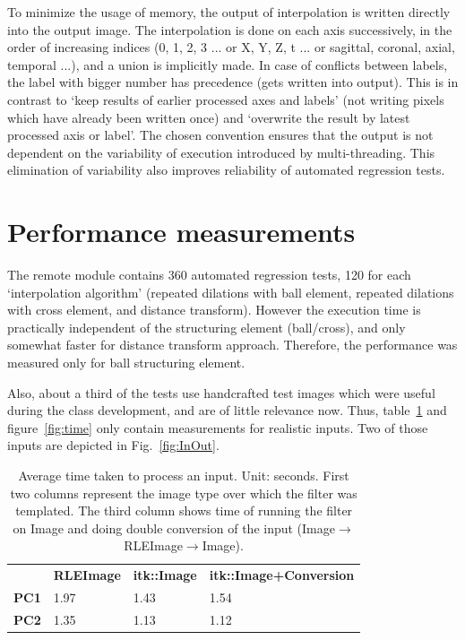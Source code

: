 \documentclass{InsightArticle}
\begin{document}
To minimize the usage of memory, the output of interpolation is written
directly into the output image.
The interpolation is done on each axis successively,
in the order of increasing indices (0, 1, 2, 3 ... or X, Y, Z, t ...
or sagittal, coronal, axial, temporal ...), and a union is implicitly made.
In case of conflicts between labels,
the label with bigger number has precedence (gets written into output).
This is in contrast to `keep results of earlier processed axes and labels'
(not writing pixels which have already been written once)
and `overwrite the result by latest processed axis or label'.
The chosen convention ensures that the output is not dependent on the
variability of execution introduced by multi-threading.
This elimination of variability also improves
reliability of automated regression tests.


\section{Performance measurements}

The remote module %
contains 360 automated regression tests, 120 for each `interpolation algorithm'
(repeated dilations with ball element, repeated dilations with cross element, and distance transform).
However the execution time is practically independent of the structuring element (ball/cross),
and only somewhat faster for distance transform approach.
Therefore, the performance was measured only for ball structuring element.

Also, about a third of the tests use handcrafted test images
which were useful during the class development, and are of little relevance now.
Thus, table~\ref{tab:time} and figure~\ref{fig:time} only contain measurements for realistic inputs.
Two of those inputs are depicted in Fig.~\ref{fig:InOut}.

\begin{table}[hbt]
    \centering
        \begin{tabular}{llll}
                     & \textbf{RLEImage} & \textbf{itk::Image} & \textbf{itk::Image+Conversion} \\
        \textbf{PC1} & 1.97              & 1.43                & 1.54                           \\
        \textbf{PC2} & 1.35              & 1.13                & 1.12
        \end{tabular}
    \caption{Average time taken to process an input. Unit: seconds.
    First two columns represent the image type over which the filter was templated.
    The third column shows time of running the filter on Image
    and doing double conversion of the input (Image$\rightarrow$RLEImage$\rightarrow$Image).}
    \label{tab:time}
\end{table}
\end{document}
